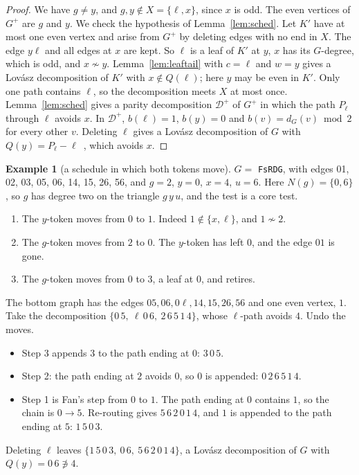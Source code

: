 \documentclass[11pt]{amsart}
\theoremstyle{definition}
\newtheorem{example}[theorem]{Example}
\newcommand{\cD}{\mathcal D}
\begin{document}
\begin{proof}
We have $g\ne y$, and $g,y\notin X=\{\ell,x\}$, since $x$ is odd. The even vertices of $G^+$ are $g$
and $y$. We check the hypothesis of Lemma~\ref{lem:sched}. Let $K'$ have at most one even vertex
and arise from $G^+$ by deleting edges with no end in $X$. The edge $y\ell$ and all edges at $x$
are kept. So $\ell$ is a leaf of $K'$ at $y$, $x$ has its $G$-degree, which is odd, and $x\not\sim y$.
Lemma~\ref{lem:leaftail} with $c=\ell$ and $w=y$ gives a Lov\'asz decomposition of $K'$ with
$x\notin Q(\ell)$; here $y$ may be even in $K'$. Only one path contains $\ell$, so the decomposition
meets $X$ at most once. Lemma~\ref{lem:sched} gives a parity decomposition $\cD^+$ of $G^+$ in which
the path $P_\ell$ through $\ell$ avoids $x$. In $\cD^+$, $b(\ell)=1$, $b(y)=0$ and $b(v)=d_G(v)\bmod2$
for every other $v$. Deleting $\ell$ gives a Lov\'asz decomposition of $G$ with
$Q(y)=P_\ell-\ell$~\cite[Lemma~2.3]{NA}, which avoids $x$.
\end{proof}

\begin{example}[a schedule in which both tokens move]\label{ex:FsRDG}
$G=$ \texttt{FsRDG}, with edges 01, 02, 03, 05, 06, 14, 15, 26, 56, and $g=2$, $y=0$, $x=4$, $u=6$. Here
$N(g)=\{0,6\}$, so $g$ has degree two on the triangle $g\,y\,u$, and the test is a core test.
\begin{enumerate}
\item The $y$-token moves from $0$ to $1$. Indeed $1\notin\{x,\ell\}$, and $1\not\sim2$.
\item The $g$-token moves from $2$ to $0$. The $y$-token has left $0$, and the edge $01$ is gone.
\item The $g$-token moves from $0$ to $3$, a leaf at $0$, and retires.
\end{enumerate}
The bottom graph has the edges $05,06,0\ell,14,15,26,56$ and one even vertex, $1$. Take the
decomposition $\{0\,5,\ \ell\,0\,6,\ 2\,6\,5\,1\,4\}$, whose $\ell$-path avoids $4$. Undo the moves.
\begin{itemize}
\item Step 3 appends $3$ to the path ending at $0$: $3\,0\,5$.
\item Step 2: the path ending at $2$ avoids $0$, so $0$ is appended: $0\,2\,6\,5\,1\,4$.
\item Step 1 is Fan's step from $0$ to $1$. The path ending at $0$ contains $1$, so the chain is
$0\to5$. Re-routing gives $5\,6\,2\,0\,1\,4$, and $1$ is appended to the path ending at $5$:
$1\,5\,0\,3$.
\end{itemize}
Deleting $\ell$ leaves $\{1\,5\,0\,3,\ 0\,6,\ 5\,6\,2\,0\,1\,4\}$, a Lov\'asz decomposition of $G$ with
$Q(y)=0\,6\not\ni4$.
\end{example}
\end{document}
